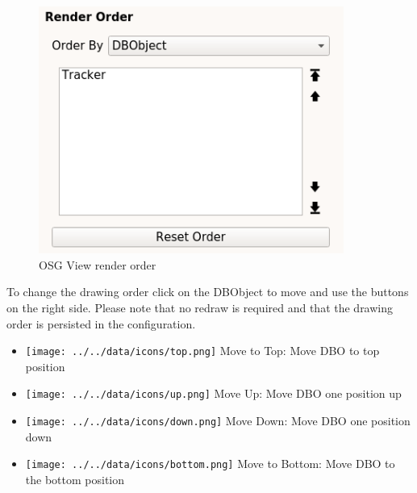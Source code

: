 \begin{figure}[H]
    \includegraphics[width=10cm,frame]{../screenshots/osgview_render_order.png}
  \caption{OSG View render order}
\end{figure}

To change the drawing order click on the DBObject to move and use the buttons on the right side. Please note that no redraw is required and that the drawing order is persisted in the configuration.
% 
 \begin{itemize}
 \item \texttt{[image: ../../data/icons/top.png]} Move to Top: Move DBO to top position
 \item \texttt{[image: ../../data/icons/up.png]} Move Up: Move DBO one position up
 \item \texttt{[image: ../../data/icons/down.png]} Move Down: Move DBO one position down
 \item \texttt{[image: ../../data/icons/bottom.png]} Move to Bottom: Move DBO to the bottom position
\end{itemize}
